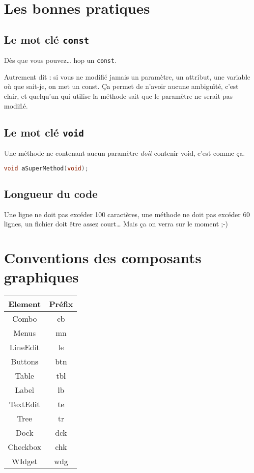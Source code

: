 \section{Les bonnes pratiques}\label{les-bonnes-pratiques}

\subsection{Le mot clé \texttt{const}}\label{le-mot-cluxe9-const}

Dès que vous pouvez\ldots{} hop un \texttt{const}.

Autrement dit : si vous ne modifié jamais un paramètre, un attribut, une
variable où que sait-je, on met un const. Ça permet de n'avoir aucune
ambiguïté, c'est clair, et quelqu'un qui utilise la méthode sait que le
paramètre ne serait pas modifié.

\subsection{Le mot clé \texttt{void}}\label{le-mot-cluxe9-void} 
Une méthode ne contenant aucun paramètre \emph{doit} contenir void,
c'est comme ça.

\begin{lstlisting}[language=C++,numbers=none]
void aSuperMethod(void);
\end{lstlisting}

\subsection{Longueur du code}\label{longueur-du-code}

Une ligne ne doit pas excéder 100 caractères, une méthode ne doit pas
excéder 60 lignes, un fichier doit être assez court\ldots{} Mais ça on
verra sur le moment ;-)

\section{Conventions des composants
graphiques}\label{conventions-des-composants-graphiques}
\begin{tabular}{c|c}
Element & Préfix\\
\hline
Combo & cb\\
Menus & mn\\
LineEdit & le\\
Buttons & btn\\
Table & tbl\\
Label & lb\\
TextEdit & te\\
Tree & tr\\
Dock & dck\\
Checkbox & chk\\
WIdget & wdg\\
\end{tabular}

